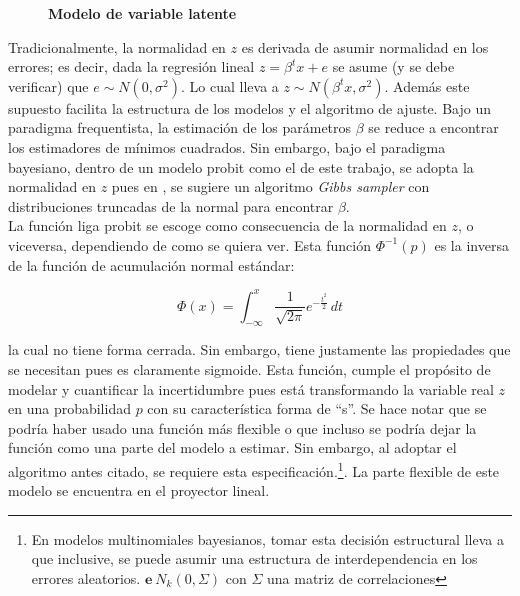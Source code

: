 \documentclass[../Main/Main.tex]{subfiles}
\begin{document}
\begin{figure}[h]
\centering
{}
\caption{\textbf{Modelo de variable latente}}
\label{fig:DiagramaVar}
\end{figure}

Tradicionalmente, la normalidad en $z$ es derivada de asumir normalidad en los errores; es decir, dada la regresión lineal $z = \beta^tx + e$ se asume (y se debe verificar) que $e \sim N(0,\sigma^2)$. Lo cual lleva a $z \sim N(\beta^tx,\sigma^2)$. Además este supuesto facilita la estructura de los modelos y el algoritmo de ajuste. Bajo un paradigma frequentista, la estimación de los parámetros $\beta$ se reduce a encontrar los estimadores de mínimos cuadrados. Sin embargo, bajo el paradigma bayesiano, dentro de un modelo probit como el de este trabajo, se adopta la normalidad en $z$ pues en  \autocite{albert1993bayesian}, se sugiere un algoritmo \textit{Gibbs sampler} con distribuciones truncadas de la normal para encontrar $\beta$.\\

La función liga probit se escoge como consecuencia de la normalidad en $z$, o viceversa, dependiendo de como se quiera ver. Esta función $\Phi^{-1}(p)$ es la inversa de la función de acumulación normal estándar:

$$\Phi(x) = \int_{-\infty}^x \dfrac{1}{\sqrt{2\pi}}e^{-\frac{t^2}{2}}\, dt$$

la cual no tiene forma cerrada. Sin embargo, tiene justamente las propiedades que se necesitan pues es claramente sigmoide. Esta función, cumple el propósito de modelar y cuantificar la incertidumbre pues está transformando la variable real $z$ en una probabilidad $p$ con su característica forma de ``s''. Se hace notar que se podría haber usado una función más flexible o que incluso se podría dejar la función como una parte del modelo a estimar. Sin embargo, al adoptar el algoritmo antes citado, se requiere esta especificación.\footnote{En modelos multinomiales bayesianos, tomar esta decisión estructural lleva a que inclusive, se puede asumir una estructura de interdependencia en los errores aleatorios. $\mathbf{e} ~ N_k(0, \Sigma)$ con $\Sigma$ una matriz de correlaciones}. La parte flexible de este modelo se encuentra en el proyector lineal. \\
\end{document}

